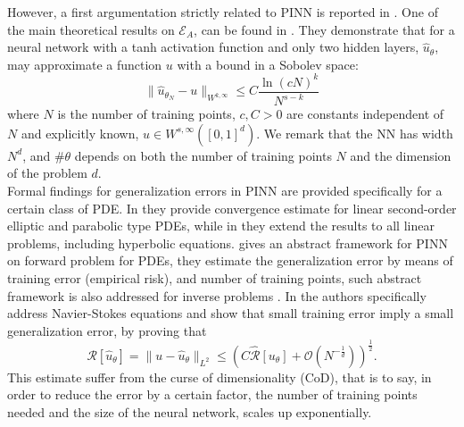 \documentclass[pdflatex,sn-basic]{sn-jnl}%
\theoremstyle{thmstyleone}%
\theoremstyle{thmstyletwo}%
\theoremstyle{thmstylethree}%
\begin{document}
However, a first argumentation strictly related to PINN is reported in \cite{Shi2020_ErrorEstimatesResidual_ZhaSZK}.
One of the main theoretical results %
on $\mathcal{E}_A$, can be found in \cite{De2021_ApproximationFunctionsTanh_LanDRLM}.
They demonstrate that for a neural network with a tanh activation function and only two hidden layers, $\hat{u}_\theta$,  may approximate a function $u$ with a bound in a Sobolev space:
\begin{equation*}
\|\hat{u}_{\theta_N} - u\|_{W^{k,\infty}}  
\leq
C
\frac{\ln (cN)^k}{N^{s-k}}
\end{equation*}
where $N$ is the number of training points, $c,C>0$ are constants independent of $N$ and explicitly known, $u\in W^{ s,\infty} ([0,1]^d)$.
We remark that the NN has width $N^d$, and $\#\theta$ depends on both the number of training points $N$ and the dimension of the problem $d$.
\\





Formal findings for generalization errors in PINN are provided specifically for a certain class of PDE.
In \cite{Shi2020_ConvergencePhysicsInformed_DarSDK} they provide convergence estimate for linear second-order elliptic and parabolic type PDEs, while in 
\cite{Shi2020_ErrorEstimatesResidual_ZhaSZK} they extend the results to all linear problems,  including hyperbolic equations.
\cite{Mis2022_EstimatesGeneralizationError_MolMM} gives an abstract framework for PINN on forward problem for PDEs, they estimate the generalization error by means of training error (empirical risk), and number of training points, such abstract framework is also addressed for inverse problems \citep{Mis2021_EstimatesGeneralizationError_MolMM}.
In \cite{De2022_ErrorEstimatesPhysics_JagDRJM}
the authors specifically address Navier-Stokes equations and show that
small training error imply a small generalization error, by proving that
\begin{equation*}
\mathcal{R}[\hat{u}_\theta] =  \|u - \hat{u}_{\theta}\|_{L^2}  
\leq
\left(
C
\widehat{\mathcal{R}}[u_\theta] 
+ 
\mathcal{O}\left(N^{-\frac{1}{d}}\right)
\right)^{\frac{1}{2}}.
\end{equation*}
%
This estimate suffer from the curse of dimensionality (CoD), that is to say, in order to reduce the error by a certain factor, the number of training points needed and the size of the neural network, scales up exponentially.
\end{document}
